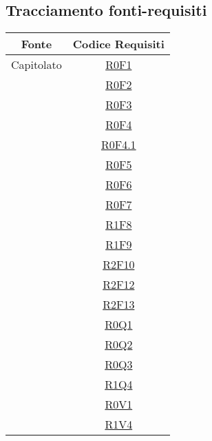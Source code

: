 \documentclass[../AnalisiDeiRequisiti.tex]{subfiles}
\begin{document}
\subsection{Tracciamento fonti-requisiti}
\normalsize
\begin{longtable}{|c|c|}
	\hline
	\textbf{Fonte} & \textbf{Codice Requisiti} \\
	\hline
	\endhead
	Capitolato & \hyperlink{R0F1}{R0F1}\\& \hyperlink{R0F2}{R0F2}\\& \hyperlink{R0F3}{R0F3}\\& \hyperlink{R0F4}{R0F4}\\& \hyperlink{R0F4.1}{R0F4.1}\\& \hyperlink{R0F5}{R0F5}\\& \hyperlink{R0F6}{R0F6}\\& \hyperlink{R0F7}{R0F7}\\& \hyperlink{R1F8}{R1F8}\\& \hyperlink{R1F9}{R1F9}\\& \hyperlink{R2F10}{R2F10}\\& \hyperlink{R2F12}{R2F12}\\& \hyperlink{R2F13}{R2F13}\\& \hyperlink{R0Q1}{R0Q1}\\& \hyperlink{R0Q2}{R0Q2}\\& \hyperlink{R0Q3}{R0Q3}\\& \hyperlink{R1Q4}{R1Q4}\\& \hyperlink{R0V1}{R0V1}\\& \hyperlink{R1V4}{R1V4}\\\hline

\end{longtable}
\end{document}
